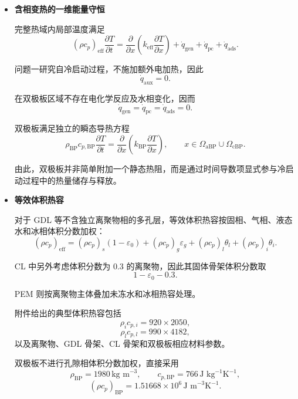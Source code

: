 \documentclass[bwprint]{gmcmthesis}
\numberwithin{equation}{section}
\numberwithin{figure}{section}
\begin{document}
\begin{itemize}
\renewcommand{\labelitemi}{$\blacktriangleright$}
\item \textbf {含相变热的一维能量守恒}

{完整热域内局部温度满足
\begin{equation}
(\rho c_p)_{\text{eff}} \frac{\partial T}{\partial t} = \frac{\partial}{\partial x} \left( k_{\text{eff}} \frac{\partial T}{\partial x} \right) + \dot{q}_{\text{gen}} + \dot{q}_{\text{pc}} + \dot{q}_{\text{ads}}. \label{eq:src:4-56}
\end{equation}}

问题一研究自冷启动过程，不施加额外电加热，因此
\[
\dot{q}_{\text{aux}} = 0.
\]

在双极板区域不存在电化学反应及水相变化，因而
\[
\dot{q}_{\text{gen}} = \dot{q}_{\text{pc}} = \dot{q}_{\text{ads}} = 0.
\]

双极板满足独立的瞬态导热方程
\begin{equation}
\rho_{\text{BP}} c_{p,\text{BP}} \frac{\partial T}{\partial t} = \frac{\partial}{\partial x} \left( k_{\text{BP}} \frac{\partial T}{\partial x} \right), \qquad x \in \Omega_{\text{aBP}} \cup \Omega_{\text{cBP}}. \label{eq:src:4-57}
\end{equation}

由此，双极板并非简单附加一个静态热阻，而是通过时间导数项显式参与冷启动过程中的热量储存与释放。

\item \textbf {等效体积热容}

对于 GDL 等不含独立离聚物相的多孔层，等效体积热容按固相、气相、液态水和冰相体积分数加权：
\begin{equation}
(\rho c_p)_{\text{eff}} = (\rho c_p)_s(1 - \varepsilon_0) + (\rho c_p)_g \varepsilon_g + (\rho c_p)_l \theta_l + (\rho c_p)_i \theta_i. \label{eq:src:4-58}
\end{equation}

CL 中另外考虑体积分数为 0.3 的离聚物，因此其固体骨架体积分数取
\[
1 - \varepsilon_0 - 0.3.
\]

PEM 则按离聚物主体叠加未冻水和冰相热容处理。

附件给出的典型体积热容包括
\[
\rho_i c_{p,i} = 920 \times 2050,
\]
\[
\rho_l c_{p,l} = 990 \times 4182,
\]
以及离聚物、GDL 骨架、CL 骨架和双极板相应材料参数。

双极板不进行孔隙相体积分数加权，直接采用
\[
\rho_{\text{BP}} = 1980 \, \text{kg m}^{-3}, \qquad c_{p,\text{BP}} = 766 \, \text{J kg}^{-1}\text{K}^{-1},
\]
\begin{equation}
(\rho c_p)_{\text{BP}} = 1.51668 \times 10^6 \, \text{J m}^{-3}\text{K}^{-1}. \label{eq:src:4-59}
\end{equation}


\end{itemize}
\end{document}
